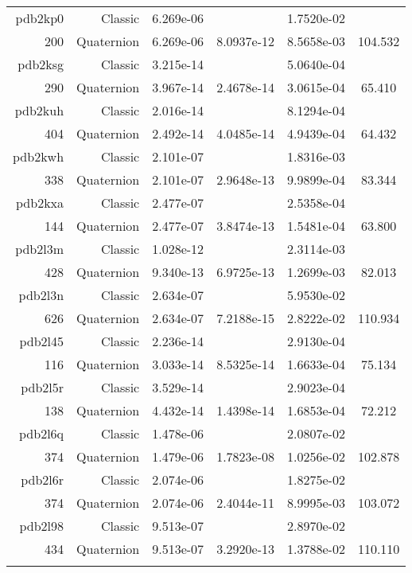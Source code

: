 \begin{xltabular}{\textwidth}{r|rS[table-format=1.3e+2]S[table-format=1.4e+2]S[table-format=1.4e+2]S[table-format=-1.3]}
pdb2kp0 & Classic & 6.269e-06 &  & 1.7520e-02 & \\
200 & Quaternion & 6.269e-06 & 8.0937e-12 & 8.5658e-03 & 104.532\\  \addlinespace
pdb2ksg & Classic & 3.215e-14 &  & 5.0640e-04 & \\
290 & Quaternion & 3.967e-14 & 2.4678e-14 & 3.0615e-04 & 65.410\\  \addlinespace
pdb2kuh & Classic & 2.016e-14 &  & 8.1294e-04 & \\
404 & Quaternion & 2.492e-14 & 4.0485e-14 & 4.9439e-04 & 64.432\\  \addlinespace
pdb2kwh & Classic & 2.101e-07 &  & 1.8316e-03 & \\
338 & Quaternion & 2.101e-07 & 2.9648e-13 & 9.9899e-04 & 83.344\\  \addlinespace
pdb2kxa & Classic & 2.477e-07 &  & 2.5358e-04 & \\
144 & Quaternion & 2.477e-07 & 3.8474e-13 & 1.5481e-04 & 63.800\\  \addlinespace
pdb2l3m & Classic & 1.028e-12 &  & 2.3114e-03 & \\
428 & Quaternion & 9.340e-13 & 6.9725e-13 & 1.2699e-03 & 82.013\\  \addlinespace
pdb2l3n & Classic & 2.634e-07 &  & 5.9530e-02 & \\
626 & Quaternion & 2.634e-07 & 7.2188e-15 & 2.8222e-02 & 110.934\\  \addlinespace
pdb2l45 & Classic & 2.236e-14 &  & 2.9130e-04 & \\
116 & Quaternion & 3.033e-14 & 8.5325e-14 & 1.6633e-04 & 75.134\\  \addlinespace
pdb2l5r & Classic & 3.529e-14 &  & 2.9023e-04 & \\
138 & Quaternion & 4.432e-14 & 1.4398e-14 & 1.6853e-04 & 72.212\\  \addlinespace
pdb2l6q & Classic & 1.478e-06 &  & 2.0807e-02 & \\
374 & Quaternion & 1.479e-06 & 1.7823e-08 & 1.0256e-02 & 102.878\\  \addlinespace
pdb2l6r & Classic & 2.074e-06 &  & 1.8275e-02 & \\
374 & Quaternion & 2.074e-06 & 2.4044e-11 & 8.9995e-03 & 103.072\\  \addlinespace
pdb2l98 & Classic & 9.513e-07 &  & 2.8970e-02 & \\
434 & Quaternion & 9.513e-07 & 3.2920e-13 & 1.3788e-02 & 110.110\\  \addlinespace

\end{xltabular}

